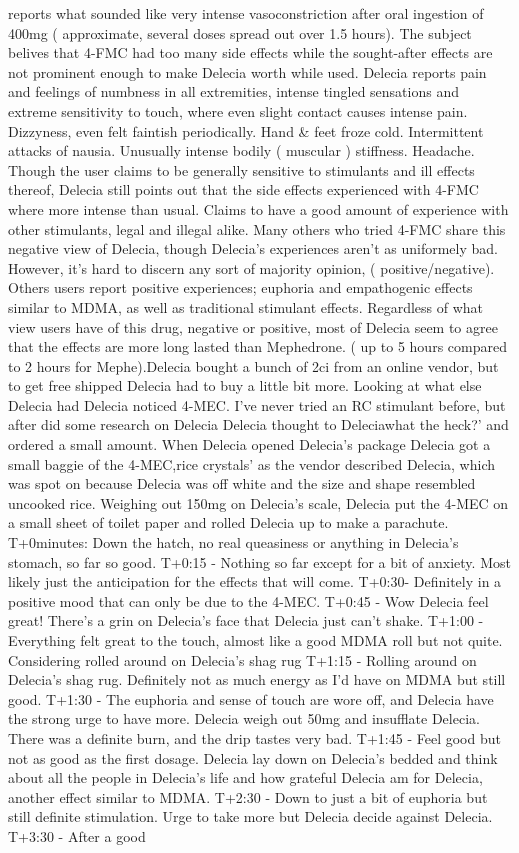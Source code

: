 \documentclass[12pt]{book}
\begin{document}
reports what sounded like very intense vasoconstriction after oral ingestion of 400mg ( approximate, several doses spread out over 1.5 hours). The subject belives that 4-FMC had too many side effects while the sought-after effects are not prominent enough to make Delecia worth while used. Delecia reports pain and feelings of numbness in all extremities, intense tingled sensations and extreme sensitivity to touch, where even slight contact causes intense pain. Dizzyness, even felt faintish periodically. Hand \& feet froze cold. Intermittent attacks of nausia. Unusually intense bodily ( muscular ) stiffness. Headache. Though the user claims to be generally sensitive to stimulants and ill effects thereof, Delecia still points out that the side effects experienced with 4-FMC where more intense than usual. Claims to have a good amount of experience with other stimulants, legal and illegal alike. Many others who tried 4-FMC share this negative view of Delecia, though Delecia's experiences aren't as uniformely bad. However, it's hard to discern any sort of majority opinion, ( positive/negative). Others users report positive experiences; euphoria and empathogenic effects similar to MDMA, as well as traditional stimulant effects. Regardless of what view users have of this drug, negative or positive, most of Delecia seem to agree that the effects are more long lasted than Mephedrone. ( up to 5 hours compared to 2 hours for Mephe).Delecia bought a bunch of 2ci from an online vendor, but to get free shipped Delecia had to buy a little bit more. Looking at what else Delecia had Delecia noticed 4-MEC. I've never tried an RC stimulant before, but after did some research on Delecia Delecia thought to Deleciawhat the heck?' and ordered a small amount. When Delecia opened Delecia's package Delecia got a small baggie of the 4-MEC,rice crystals' as the vendor described Delecia, which was spot on because Delecia was off white and the size and shape resembled uncooked rice. Weighing out 150mg on Delecia's scale, Delecia put the 4-MEC on a small sheet of toilet paper and rolled Delecia up to make a parachute. T+0minutes: Down the hatch, no real queasiness or anything in Delecia's stomach, so far so good. T+0:15 - Nothing so far except for a bit of anxiety. Most likely just the anticipation for the effects that will come. T+0:30- Definitely in a positive mood that can only be due to the 4-MEC. T+0:45 - Wow Delecia feel great! There's a grin on Delecia's face that Delecia just can't shake. T+1:00 - Everything felt great to the touch, almost like a good MDMA roll but not quite. Considering rolled around on Delecia's shag rug T+1:15 - Rolling around on Delecia's shag rug. Definitely not as much energy as I'd have on MDMA but still good. T+1:30 - The euphoria and sense of touch are wore off, and Delecia have the strong urge to have more. Delecia weigh out 50mg and insufflate Delecia. There was a definite burn, and the drip tastes very bad. T+1:45 - Feel good but not as good as the first dosage. Delecia lay down on Delecia's bedded and think about all the people in Delecia's life and how grateful Delecia am for Delecia, another effect similar to MDMA. T+2:30 - Down to just a bit of euphoria but still definite stimulation. Urge to take more but Delecia decide against Delecia. T+3:30 - After a good 
\end{document}
